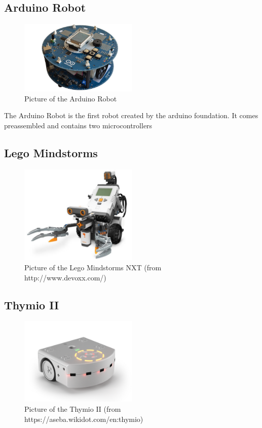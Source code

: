 \documentclass[twocolumn]{article}
\begin{document}
\subsection{Arduino Robot}
\begin{figure}[h!]
  \centering
  \includegraphics[width=0.5\textwidth]{images/arduinorobot.jpg}
  \caption{Picture of the Arduino Robot}
\end{figure}

The Arduino Robot is the first robot created by the arduino foundation. It comes preassembled and contains two microcontrollers 
\subsection{Lego Mindstorms}
\begin{figure}[h!]
  \centering
  \includegraphics[width=0.5\textwidth]{images/mindstorms.jpg}
  \caption{Picture of the Lego Mindstorms NXT (from http://www.devoxx.com/)}
\end{figure}
\subsection{Thymio II}
\begin{figure}[h!]
  \centering
  \includegraphics[width=0.5\textwidth]{images/thymioii.jpg}
  \caption{Picture of the Thymio II (from https://aseba.wikidot.com/en:thymio)}
\end{figure}
\end{document}
